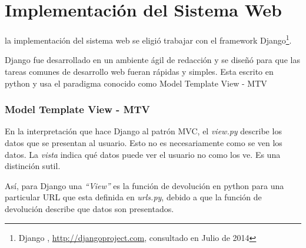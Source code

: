 

\begin{savequote}[75mm]
\end{savequote}

\chapter{Implementación del Sistema Web}

 la implementación del sistema web se eligió trabajar con el
framework Django\footnote{Django \citeauthor{website:djangoproject}, \url{http://djangoproject.com}, consultado en
Julio de 2014}.

Django fue desarrollado en un ambiente ágil de redacción y se diseñó para que
las tareas comunes de desarrollo web fueran rápidas y simples. Esta escrito en
python y usa el paradigma conocido como Model Template View - MTV


\subsection{Model Template View - MTV}

En la interpretación que hace Django al patrón MVC, el {\it view.py} describe los
datos que se presentan al usuario. Esto no es necesariamente como se ven los datos.
La {\it vista} indica qué datos puede ver el usuario no como los ve. Es una distinción
sutil.

Así, para Django una {\it ``View''} es la función de devolución en python para
una particular URL que esta definida en {\it urls.py}, debido a que la función
de devolución describe que datos son presentados.

